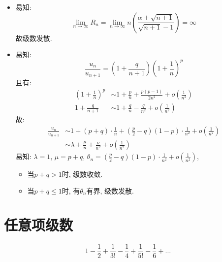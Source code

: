 \begin{solution}
    \begin{itemize}
        \item 易知: \[
                \lim_{n \to \infty} R_{n}=\lim_{n \to \infty} n\left(
                    \frac{\alpha+\sqrt{n+1}}{\sqrt{n+1}-1}
                \right)= \infty
            \]
            故级数发散.
        \item 易知: \[
                \frac{u_{n}}{u_{n+1}}= \left(
                1+\frac{q}{n+1} \right)\left(
                1+\frac{1}{n} \right)^{p}
            \]
            且有:
            \begin{align}
                \left( 1+\frac{1}{n} \right)^{p} & \sim 1+
                \frac{p}{n}+
                \frac{p(p-1)}{2n^{2}} + o(\frac{1}{n^{2}})
                \\
                1 + \frac{q}{n+1}                & \sim
                1+\frac{q}{n}-\frac{q}{n^{2}}+o(\frac{1}{n^{2}})
            \end{align}
            故:
            \begin{align*}
                \frac{u_{n}}{u_{n+1}} & \sim  1+(p+q)\cdot
                \frac{1}{n}+\left(
                \frac{p}{2}-q \right)\left( 1-p\right) \cdot
                \frac{1}{n^{2}}+o(\frac{1}{n^{2}})
                \\
                & \sim \lambda + \frac{\mu}{n} + \frac{\nu}{n^{2}} +
                o(\frac{1}{n^{2}})
            \end{align*}
            易知: \(\lambda = 1\), \(\mu = p+q\), \(\theta_{n} =
                \left(\frac{p}{2}-q
                \right)\left(
            1-p\right)\cdot\frac{1}{n^{2}}+o(\frac{1}{n^{2}})\),
            \begin{itemize}
                \item 当\(p+q > 1\)时, 级数收敛.
                \item 当\(p+q \le 1\)时, 有\(\theta_n\)有界, 级数发散.
            \end{itemize}
    \end{itemize}

\end{solution}
\section{任意项级数}
\[
    1 - \frac{1}{2} + \frac{1}{3!} - \frac{1}{4} + \frac{1}{5!} -
    \frac{1}{6} + \dots
\]

